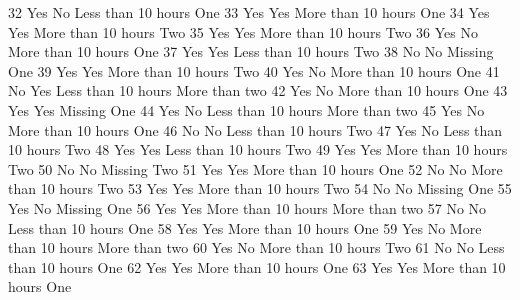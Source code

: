 \documentclass[
  letterpaper,
  DIV=11,
  numbers=noendperiod]{scrreprt}
\newenvironment{Shaded}{\begin{snugshade}}{\end{snugshade}}
\newcommand{\NormalTok}[1]{\textcolor[rgb]{0.00,0.23,0.31}{#1}}
\begin{document}
\begin{Shaded}
\begin{Highlighting}[]
\NormalTok{32                Yes             No Less than 10 hours           One}
\NormalTok{33                Yes            Yes More than 10 hours           One}
\NormalTok{34                Yes            Yes More than 10 hours           Two}
\NormalTok{35                Yes            Yes More than 10 hours           Two}
\NormalTok{36                Yes             No More than 10 hours           One}
\NormalTok{37                Yes            Yes Less than 10 hours           Two}
\NormalTok{38                 No             No            Missing           One}
\NormalTok{39                Yes            Yes More than 10 hours           Two}
\NormalTok{40                Yes             No More than 10 hours           One}
\NormalTok{41                 No            Yes Less than 10 hours More than two}
\NormalTok{42                Yes             No More than 10 hours           One}
\NormalTok{43                Yes            Yes            Missing           One}
\NormalTok{44                Yes             No Less than 10 hours More than two}
\NormalTok{45                Yes             No More than 10 hours           One}
\NormalTok{46                 No             No Less than 10 hours           Two}
\NormalTok{47                Yes             No Less than 10 hours           Two}
\NormalTok{48                Yes            Yes Less than 10 hours           Two}
\NormalTok{49                Yes            Yes More than 10 hours           Two}
\NormalTok{50                 No             No            Missing           Two}
\NormalTok{51                Yes            Yes More than 10 hours           One}
\NormalTok{52                 No             No More than 10 hours           Two}
\NormalTok{53                Yes            Yes More than 10 hours           Two}
\NormalTok{54                 No             No            Missing           One}
\NormalTok{55                Yes             No            Missing           One}
\NormalTok{56                Yes            Yes More than 10 hours More than two}
\NormalTok{57                 No             No Less than 10 hours           One}
\NormalTok{58                Yes            Yes More than 10 hours           One}
\NormalTok{59                Yes             No More than 10 hours More than two}
\NormalTok{60                Yes             No More than 10 hours           Two}
\NormalTok{61                 No             No Less than 10 hours           One}
\NormalTok{62                Yes            Yes More than 10 hours           One}
\NormalTok{63                Yes            Yes More than 10 hours           One}

\end{Highlighting}
\end{Shaded}
\end{document}
